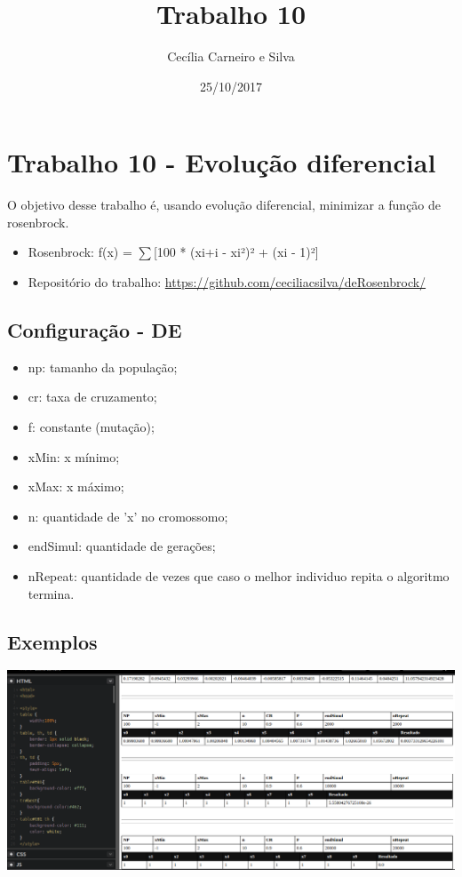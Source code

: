 \documentclass[11pt]{article}
\author{Cecília Carneiro e Silva}
\date{25/10/2017}
\title{Trabalho 10}
\begin{document}
\maketitle

\section{Trabalho 10 - Evolução diferencial}
\label{sec-1}

O objetivo desse trabalho é, usando evolução diferencial, minimizar a função de rosenbrock.

\begin{itemize}
\item Rosenbrock: f(x) = $\sum$[100 * (xi+i - xi²)² + (xi - 1)²]

\item Repositório do trabalho: \url{https://github.com/ceciliacsilva/deRosenbrock/}
\end{itemize}

\subsection{Configuração - DE}
\label{sec-1-1}

\begin{itemize}
\item np: tamanho da população;
\item cr: taxa de cruzamento;
\item f: constante (mutação);
\item xMin: x mínimo;
\item xMax: x máximo;
\item n: quantidade de 'x' no cromossomo;
\item endSimul: quantidade de gerações;
\item nRepeat: quantidade de vezes que caso o melhor individuo repita o algoritmo termina.
\end{itemize}

\subsection{Exemplos}
\label{sec-1-2}

\includegraphics[width=.9\linewidth]{img/rosenbrock2.png}
\end{document}
